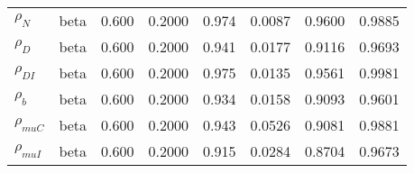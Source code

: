 \begin{center}
\begin{longtable}{llcccccc}
${\rho_N}$ & beta &   0.600 & 0.2000 &   0.974& 0.0087 &  0.9600 &  0.9885 \\ 
${\rho_D}$ & beta &   0.600 & 0.2000 &   0.941& 0.0177 &  0.9116 &  0.9693 \\ 
${\rho_{DI}}$ & beta &   0.600 & 0.2000 &   0.975& 0.0135 &  0.9561 &  0.9981 \\ 
${\rho_b}$ & beta &   0.600 & 0.2000 &   0.934& 0.0158 &  0.9093 &  0.9601 \\ 
${\rho_{muC}}$ & beta &   0.600 & 0.2000 &   0.943& 0.0526 &  0.9081 &  0.9881 \\ 
${\rho_{muI}}$ & beta &   0.600 & 0.2000 &   0.915& 0.0284 &  0.8704 &  0.9673 \\ 
\end{longtable}
 \end{center}
